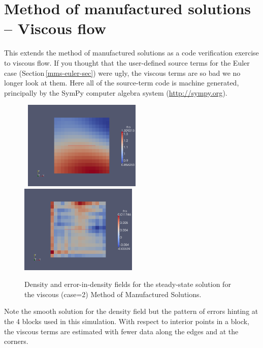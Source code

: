 
\section{Method of manufactured solutions -- Viscous flow}
\label{mms-viscous-sec}
%
This extends the method of manufactured solutions 
as a code verification exercise to viscous flow.
If you thought that the user-defined source terms for 
the Euler case (Section\,\ref{mms-euler-sec}) were ugly,
the viscous terms are so bad we no longer look at them.
Here all of the source-term code is machine generated, 
principally by the SymPy computer algebra system (\url{http://sympy.org}).

\begin{figure}[htbp]
\begin{center}
\mbox{
\includegraphics[width=0.5\textwidth]{../2D/mms/density-field-at-80ms.png}
\includegraphics[width=0.5\textwidth]{../2D/mms/density-error-at-80ms.png}
}
\end{center}
\caption{Density and error-in-density fields for the steady-state solution for the
  viscous (case=2) Method of Manufactured Solutions.}
\label{mms-viscous-density-error-fig}
\end{figure}

\noindent
Note the smooth solution for the density field but the pattern of errors hinting
at the 4 blocks used in this simulation.
With respect to interior points in a block, the viscous terms are estimated 
with fewer data along the edges and at the corners.


